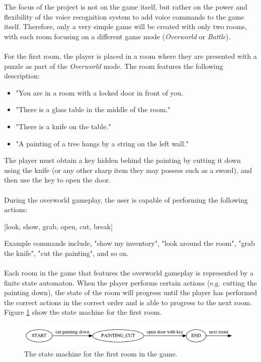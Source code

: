 \documentclass[12pt]{article}
\begin{document}
The focus of the project is not on the game itself, but rather on the power and flexibility of the voice recognition system to add voice commands to the game itself. Therefore, only a very simple game will be created with only two rooms, with each room focusing on a different game mode (\textit{Overworld} or \textit{Battle}).
\\
\\
For the first room, the player is placed in a room where they are presented with a puzzle as part of the \textit{Overworld} mode. The room features the following description:

\begin{itemize}
\item "You are in a room with a locked door in front of you.

\item "There is a glass table in the middle of the room."

\item "There is a knife on the table."

\item "A painting of a tree hangs by a string on the left wall."
\end{itemize}

The player must obtain a key hidden behind the painting by cutting it down using the knife (or any other sharp item they may possess such as a sword), and then use the key to open the door.
\\
\\
During the overworld gameplay, the user is capable of performing the following actions:

\begin{center}
[look, show, grab, open, cut, break]
\end{center}

Example commands include, "show my inventory", "look around the room", "grab the knife", "cut the painting", and so on.
\\
\\
Each room in the game that features the overworld gameplay is represented by a finite state automaton. When the player performs certain actions (e.g. cutting the painting down), the state of the room will progress until the player has performed the correct  actions in the correct order and is able to progress to the next room. Figure \ref{fig:room1-fsa} show the state machine for the first room.

\begin{center}
\begin{figure}[H]
\begin{center}
  \includegraphics[width=\linewidth]{room1-fsa.pdf}
  \caption{The state machine for the first room in the game.}
  \label{fig:room1-fsa}
  \end{center}
\end{figure}
\end{center}
\end{document}

